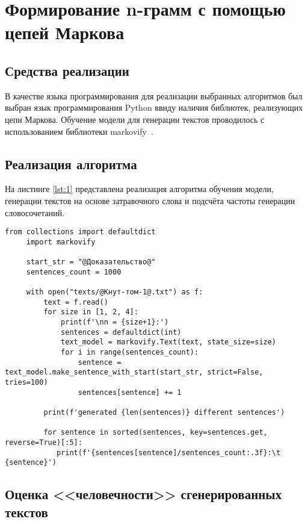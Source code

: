 \chapter{Формирование n-грамм с помощью цепей Маркова}

\section{Средства реализации}

В качестве языка программирования для реализации выбранных алгоритмов был выбран язык программирования Python \cite{pythonlang} ввиду наличия библиотек, реализующих цепи Маркова. Обучение модели для генерации текстов проводилось с использованием библиотеки markovify~\cite{markovify}.

\section{Реализация алгоритма}

На листинге \ref{lst:1} представлена реализация алгоритма обучения модели, генерации текстов на основе затравочного слова и подсчёта частоты генерации словосочетаний.

\begin{lstlisting}[label=lst:1,caption=Алгоритм генерации предложений на основе обучающей выборки и затравочного слова]
	 from collections import defaultdict
	 import markovify
	 
	 start_str = "@Доказательство@"
	 sentences_count = 1000
	 
	 with open("texts/@Кнут-том-1@.txt") as f:
		 text = f.read()
		 for size in [1, 2, 4]:
			 print(f'\nn = {size+1}:')
			 sentences = defaultdict(int)
			 text_model = markovify.Text(text, state_size=size)
			 for i in range(sentences_count):
				 sentence = text_model.make_sentence_with_start(start_str, strict=False, tries=100)
				 sentences[sentence] += 1
	 
		 print(f'generated {len(sentences)} different sentences')
		 
		 for sentence in sorted(sentences, key=sentences.get, reverse=True)[:5]:
		 	print(f'{sentences[sentence]/sentences_count:.3f}:\t {sentence}')
\end{lstlisting}

\section{Оценка <<человечности>> сгенерированных текстов}

